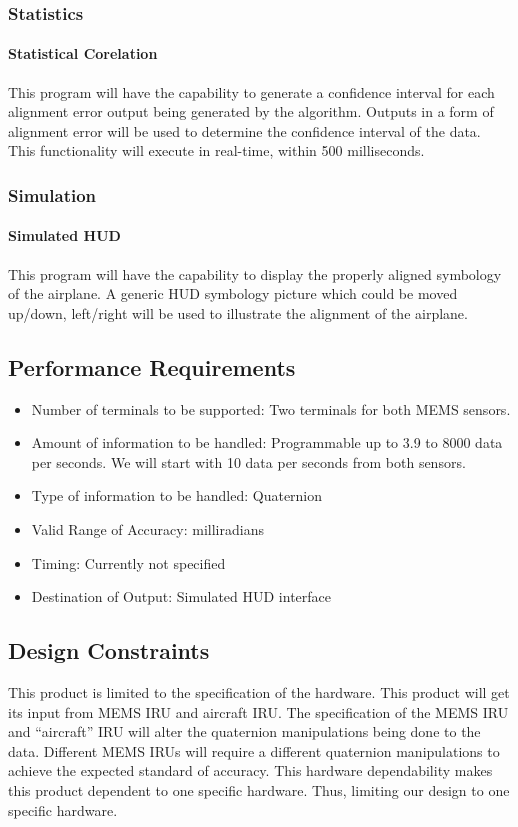 \subsubsection{Statistics}
\paragraph{Statistical Corelation}
This program will have the capability to generate a confidence interval for each alignment error output being generated by the algorithm. Outputs in a form of alignment error will be used to determine the confidence interval of the data. This functionality will execute in real-time, within 500 milliseconds. 
\\
\subsubsection{Simulation}
\paragraph{Simulated HUD}
This program will have the capability to display the properly aligned symbology of the airplane. A generic HUD symbology picture which could be moved up/down, left/right will be used to illustrate the alignment of the airplane.


\subsection{Performance Requirements}
\begin{itemize}
	\item Number of terminals to be supported: Two terminals for both MEMS sensors. 
	\item Amount of information to be handled: Programmable up to 3.9 to 8000 data per seconds. We will start with 10 data per seconds from both sensors. 
	\item Type of information to be handled: Quaternion 
	\item Valid Range of Accuracy: milliradians 
	\item Timing: Currently not specified 
	\item Destination of Output: Simulated HUD interface
\end{itemize}	

\subsection{Design Constraints}
This product is limited to the specification of the hardware. This product will get its input from MEMS IRU and aircraft IRU. The specification of the MEMS IRU and “aircraft” IRU will alter the quaternion manipulations being done to the data.  Different MEMS IRUs will require a different quaternion manipulations to achieve the expected standard of accuracy. This hardware dependability makes this product dependent to one specific hardware. Thus, limiting our design to one specific hardware.

